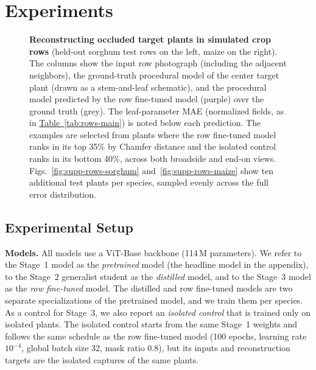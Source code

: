 \documentclass[10pt,twocolumn,letterpaper]{article}
\newcommand{\tabref}[1]{\hyperref[#1]{Table~\ref*{#1}}}
\begin{document}
\section{Experiments}
\label{sec:results}\label{sec:experiments}

\begin{figure}[t]
  \centering
  \resizebox{\linewidth}{!}{}
  \caption{\textbf{Reconstructing occluded target plants in simulated crop rows} (held-out sorghum test rows on the left, maize on the right). The columns show the input row photograph (including the adjacent neighbors), the ground-truth procedural model of the center target plant (drawn as a stem-and-leaf schematic), and the procedural model predicted by the row fine-tuned model (purple) over the ground truth (grey). The leaf-parameter MAE (normalized fields, as in \tabref{tab:rows-main}) is noted below each prediction. The examples are selected from plants where the row fine-tuned model ranks in its top 35\% by Chamfer distance and the isolated control ranks in its bottom 40\%, across both broadside and end-on views. \textcolor{cvprblue}{Figs.}~\ref{fig:supp-rows-sorghum} and~\ref{fig:supp-rows-maize} show ten additional test plants per species, sampled evenly across the full error distribution.}
  \label{fig:rowsex}
\end{figure}

\subsection{Experimental Setup}
\label{sec:setup}\label{sec:exp-setup}

\noindent\textbf{Models.}
All models use a ViT-Base backbone (114\,M parameters). We refer to the Stage~1 model as the \emph{pretrained} model (the headline model in the appendix), to the Stage~2 generalist student as the \emph{distilled} model, and to the Stage~3 model as the \emph{row fine-tuned} model. The distilled and row fine-tuned models are two separate specializations of the pretrained model, and we train them per species. As a control for Stage~3, we also report an \emph{isolated control} that is trained only on isolated plants. The isolated control starts from the same Stage~1 weights and follows the same schedule as the row fine-tuned model (100 epochs, learning rate $10^{-4}$, global batch size 32, mask ratio 0.8), but its inputs and reconstruction targets are the isolated captures of the same plants.
\end{document}
